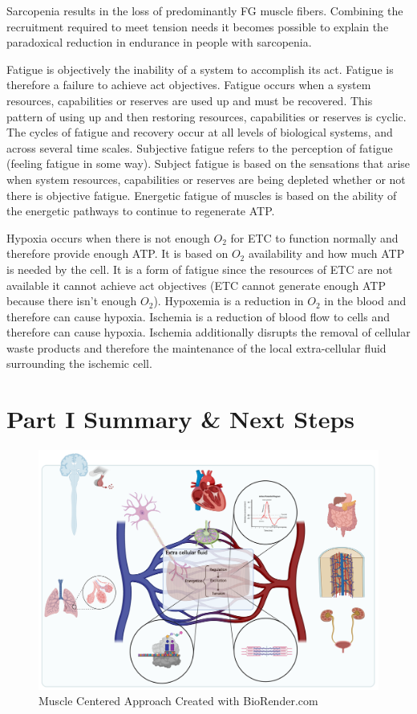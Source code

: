 Sarcopenia results in the loss of predominantly FG muscle fibers. Combining the recruitment required to meet tension needs it becomes possible to explain the paradoxical reduction in endurance in people with sarcopenia. 

Fatigue is objectively the inability of a system to accomplish its act. Fatigue is therefore a failure to achieve act objectives. Fatigue occurs when a system resources, capabilities or reserves are used up and must be recovered. This pattern of using up and then restoring resources, capabilities or reserves is cyclic. The cycles of fatigue and recovery occur at all levels of biological systems, and across several time scales. Subjective fatigue refers to the perception of fatigue (feeling fatigue in some way). Subject fatigue is based on the sensations that arise when system resources, capabilities or reserves are being depleted whether or not there is objective fatigue. Energetic fatigue of muscles is based on the ability of the energetic pathways to continue to regenerate ATP.

Hypoxia occurs when there is not enough $O_2$ for ETC to function normally and therefore provide enough ATP. It is based on $O_2$ availability and how much ATP is needed by the cell. It is a form of fatigue since the resources of ETC are not available it cannot achieve act objectives (ETC cannot generate enough ATP because there isn't enough $O_2$). Hypoxemia is a reduction in $O_2$ in the blood and therefore can cause hypoxia. Ischemia is a reduction of blood flow to cells and therefore can cause hypoxia. Ischemia additionally disrupts the removal of cellular waste products and therefore the maintenance of the local extra-cellular fluid surrounding the ischemic cell. 

\section{Part I Summary \& Next Steps}

\begin{figure}[!h]
    \centering
    \includegraphics[width=1\linewidth]{./figure/Course_Graphic.png}
    \caption{Muscle Centered Approach \footnotesize{Created with BioRender.com}}
    \label{fig:course_graphic}
\end{figure}

